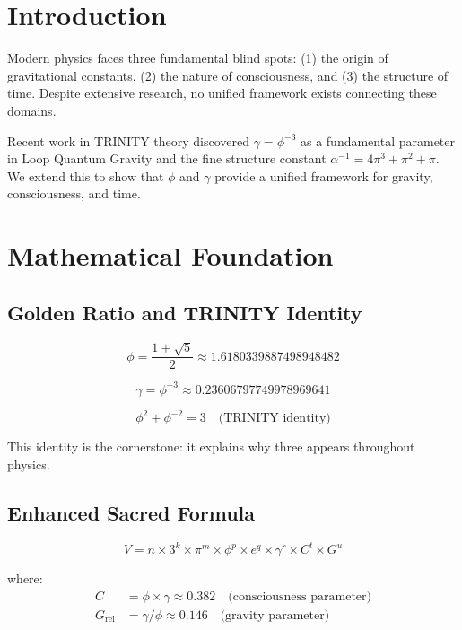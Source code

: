 \documentclass[12pt,a4paper]{article}
\begin{document}
\section{Introduction}

Modern physics faces three fundamental blind spots: (1) the origin of gravitational constants, (2) the nature of consciousness, and (3) the structure of time. Despite extensive research, no unified framework exists connecting these domains.

Recent work in TRINITY theory discovered $\gamma = \phi^{-3}$ as a fundamental parameter in Loop Quantum Gravity and the fine structure constant $\alpha^{-1} = 4\pi^3 + \pi^2 + \pi$. We extend this to show that $\phi$ and $\gamma$ provide a unified framework for gravity, consciousness, and time.

\section{Mathematical Foundation}

\subsection{Golden Ratio and TRINITY Identity}

\begin{equation}
\phi = \frac{1 + \sqrt{5}}{2} \approx 1.6180339887498948482
\end{equation}

\begin{equation}
\gamma = \phi^{-3} \approx 0.23606797749978969641
\end{equation}

\begin{equation}
\phi^2 + \phi^{-2} = 3 \quad \text{(TRINITY identity)}
\end{equation}

This identity is the cornerstone: it explains why three appears throughout physics.

\subsection{Enhanced Sacred Formula}

\begin{equation}
V = n \times 3^k \times \pi^m \times \phi^p \times e^q \times \gamma^r \times C^t \times G^u
\end{equation}

where:
\begin{align}
C &= \phi \times \gamma \approx 0.382 \quad \text{(consciousness parameter)} \\
G_{\text{rel}} &= \gamma / \phi \approx 0.146 \quad \text{(gravity parameter)}
\end{align}
\end{document}
